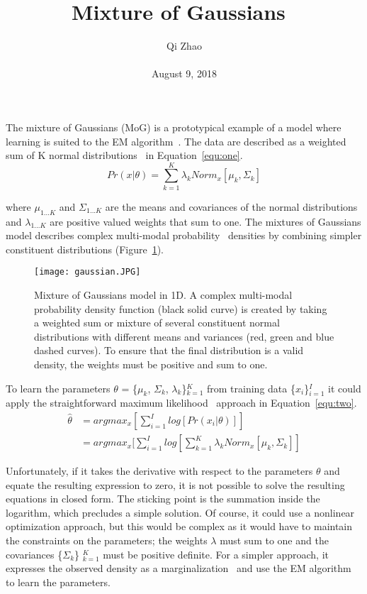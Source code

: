 \documentclass[10pt,twocolumn,letterpaper]{article}
\begin{document}
\title{  Mixture of Gaussians~\cite{Dasgupta1999Learning}}
\author{Qi Zhao\\\\August 9, 2018}

\maketitle
The mixture of Gaussians (MoG) is a prototypical example of a model where learning is suited to the EM algorithm~\cite{Wu1983On}. The data are described as a weighted sum of K normal distributions~\cite{Andrews1974Scale} in Equation~\ref{equ:one}.
\begin{equation}\label{equ:one}
Pr(x|\theta) = \sum_{k = 1}^K \lambda_kNorm_x[\mu_k, \Sigma_k]
\end{equation}

where $\mu_{1...K}$ and $\Sigma_{1...K}$ are the means and covariances of the normal distributions and $\lambda_{1...K}$ are positive valued weights that sum to one. The mixtures of Gaussians model describes complex multi-modal probability~\cite{Nagode1998A} densities by combining simpler constituent distributions (Figure~\ref{fig:onecol}).
\begin{figure}[H]
\centering
\texttt{[image: gaussian.JPG]}
 \caption{ Mixture of Gaussians model in 1D. A complex multi-modal probability density function (black solid curve) is created by taking a weighted sum or mixture of several constituent normal distributions with different means and variances (red, green and blue dashed curves). To ensure that the final distribution is a valid density, the weights must be positive and sum to one.}
\label{fig:onecol}
\end{figure}

To learn the parameters $\theta$ = \{$\mu_k$, $\Sigma_k$, $\lambda_k$\}$^K_{k=1}$ from training data \{$x_i$\}$^I_{i=1}$ it could apply the straightforward maximum likelihood~\cite{Dempster1977Maximum} approach in Equation~\ref{equ:two}.
\begin{equation}
\begin{split}
\hat{\theta} & = argmax_x[\sum_{i = 1}^Ilog[Pr(x_i|\theta)]] \\
& = argmax_x[\sum_{i = 1}^Ilog[\sum_{k = 1}^K \lambda_kNorm_x[\mu_k, \Sigma_k]]
\end{split}
\label{equ:two}
\end{equation}

Unfortunately, if it takes the derivative with respect to the parameters $\theta$ and equate the resulting expression to zero, it is not possible to solve the resulting equations in closed form. The sticking point is the summation inside the logarithm, which precludes a simple solution. Of course, it could use a nonlinear optimization approach, but this would be complex as it would have to maintain the constraints on the parameters; the weights $\lambda$ must sum to one and the covariances \{$\Sigma_k$\} $^K_{k = 1}$ must be positive definite. For a simpler approach, it expresses the observed density as a marginalization~\cite{Larsson2008Fixed} and use the EM algorithm to learn the parameters.


{\small


}
\end{document}
